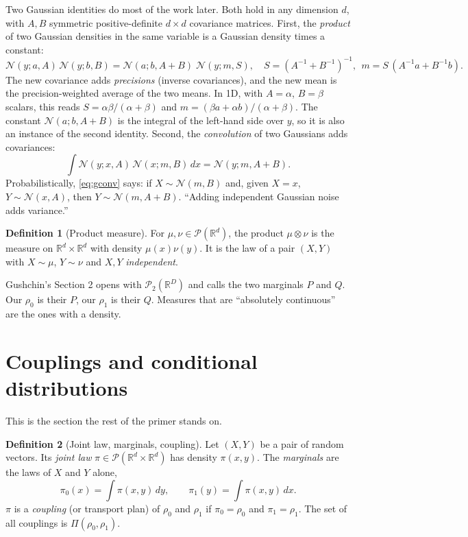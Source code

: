 \documentclass[11pt]{article}
\newcommand{\R}{\mathbb{R}}
\newcommand{\Pc}{\mathcal{P}}
\newcommand{\Nc}{\mathcal{N}}
\theoremstyle{definition}
\newtheorem{definition}{Definition}[section]
\theoremstyle{plain}
\begin{document}
Two Gaussian identities do most of the work later. Both hold in any dimension $d$, with
$A,B$ symmetric positive-definite $d\times d$ covariance matrices. First, the \emph{product}
of two Gaussian densities in the same variable is a Gaussian density times a constant:
\begin{equation}
  \label{eq:gprod}
  \Nc(y;a,A)\,\Nc(y;b,B)=\Nc(a;b,A+B)\;\Nc(y;m,S),\quad
  S=(A^{-1}\!+\!B^{-1})^{-1},\ \ m=S\,(A^{-1}a+B^{-1}b).
\end{equation}
The new covariance adds \emph{precisions} (inverse covariances), and the new mean is the
precision-weighted average of the two means. In 1D, with $A=\alpha$, $B=\beta$ scalars, this
reads $S=\alpha\beta/(\alpha+\beta)$ and $m=(\beta a+\alpha b)/(\alpha+\beta)$. The
constant $\Nc(a;b,A+B)$ is the integral of the left-hand side over $y$, so it is also an
instance of the second identity. Second, the \emph{convolution} of two Gaussians adds
covariances:
\begin{equation}
  \label{eq:gconv}
  \int \Nc(y;x,A)\,\Nc(x;m,B)\,dx=\Nc(y;m,A+B).
\end{equation}
Probabilistically, \eqref{eq:gconv} says: if $X\sim\Nc(m,B)$ and, given $X=x$, $Y\sim\Nc(x,A)$,
then $Y\sim\Nc(m,A+B)$. ``Adding independent Gaussian noise adds variance.''

\begin{definition}[Product measure]
For $\mu,\nu\in\Pc(\R^d)$, the product $\mu\otimes\nu$ is the measure on $\R^d\times\R^d$
with density $\mu(x)\nu(y)$. It is the law of a pair $(X,Y)$ with $X\sim\mu$, $Y\sim\nu$
and $X,Y$ \emph{independent}.
\end{definition}

\begin{readbox}
Gushchin's Section 2 opens with $\Pc_2(\R^D)$ and calls the two marginals $P$ and $Q$. Our
$\rho_0$ is their $P$, our $\rho_1$ is their $Q$. Measures that are ``absolutely continuous''
are the ones with a density.
\end{readbox}

\section{Couplings and conditional distributions}
\label{sec:couplings}

This is the section the rest of the primer stands on.

\begin{definition}[Joint law, marginals, coupling]
Let $(X,Y)$ be a pair of random vectors. Its \emph{joint law} $\pi\in\Pc(\R^d\times\R^d)$
has density $\pi(x,y)$. The \emph{marginals} are the laws of $X$ and $Y$ alone,
\[
  \pi_0(x)=\int\pi(x,y)\,dy,\qquad \pi_1(y)=\int\pi(x,y)\,dx .
\]
$\pi$ is a \emph{coupling} (or transport plan) of $\rho_0$ and $\rho_1$ if $\pi_0=\rho_0$
and $\pi_1=\rho_1$. The set of all couplings is $\Pi(\rho_0,\rho_1)$.
\end{definition}
\end{document}
